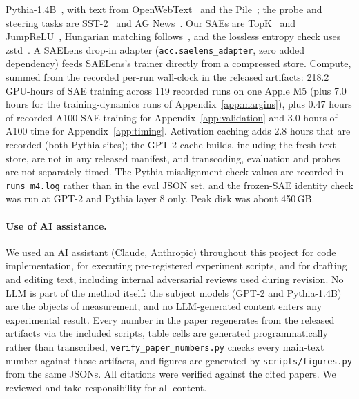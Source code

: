 \documentclass{article}
\begin{document}
Pythia-1.4B~\citep{pythia}, with text from OpenWebText~\citep{openwebtext}
and the Pile~\citep{pile}; the probe and steering tasks are
SST-2~\citep{sst2} and AG News~\citep{agnews}. Our SAEs are
TopK~\citep{topk} and JumpReLU~\citep{jumprelu}, Hungarian matching
follows~\citep{hungarian}, and the lossless entropy check uses
zstd~\citep{zstd}. A SAELens drop-in adapter
(\texttt{acc.saelens\_adapter}, zero added dependency) feeds SAELens's
trainer directly from a compressed store. Compute, summed from the recorded
per-run wall-clock in the released artifacts: 218.2 GPU-hours of
SAE training across 119 recorded runs on one Apple M5 (plus 7.0 hours for
the training-dynamics runs of Appendix~\ref{app:margins}), plus 0.47 hours
of recorded A100 SAE training for Appendix~\ref{app:validation} and 3.0
hours of A100 time for Appendix~\ref{app:timing}. Activation
caching adds 2.8 hours that are recorded (both Pythia sites); the GPT-2
cache builds, including the fresh-text store, are not in any released
manifest, and transcoding, evaluation
and probes are not separately timed. The Pythia misalignment-check values are
recorded in \texttt{runs\_m4.log} rather than in the eval JSON set, and
the frozen-SAE identity check was run at GPT-2 and Pythia layer 8
only. Peak disk was about 450\,GB.

\paragraph{Use of AI assistance.} We used an AI assistant (Claude,
Anthropic) throughout this project for code implementation, for
executing pre-registered experiment scripts, and for drafting and
editing text, including internal adversarial reviews used during
revision. No LLM is part of the method itself: the subject models
(GPT-2 and Pythia-1.4B) are the objects of measurement, and no
LLM-generated content enters any experimental result. Every number in
the paper regenerates from the released artifacts via the included
scripts, table cells are generated programmatically rather than
transcribed, \texttt{verify\_paper\_numbers.py} checks every main-text
number against those artifacts, and figures are generated by
\texttt{scripts/figures.py} from the same JSONs. All citations were
verified against the cited papers. We reviewed and take
responsibility for all content.
\endgroup
\end{document}
